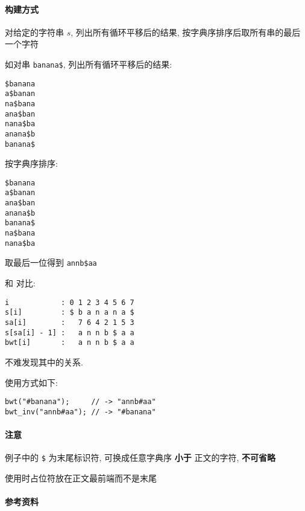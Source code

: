 \paragraph{构建方式}

对给定的字符串 \(s\), 列出所有循环平移后的结果, 按字典序排序后取所有串的最后一个字符

如对串 \verb|banana$|, 列出所有循环平移后的结果:

\begin{verbatim}
$banana
a$banan
na$bana
ana$ban
nana$ba
anana$b
banana$
\end{verbatim}

按字典序排序:

\begin{verbatim}
$banana
a$banan
ana$ban
anana$b
banana$
na$bana
nana$ba
\end{verbatim}

取最后一位得到 \verb|annb$aa|

和  对比:

\begin{verbatim}
i            : 0 1 2 3 4 5 6 7
s[i]         : $ b a n a n a $
sa[i]        :   7 6 4 2 1 5 3
s[sa[i] - 1] :   a n n b $ a a
bwt[i]       :   a n n b $ a a
\end{verbatim}

不难发现其中的关系.

使用方式如下:

\begin{verbatim}
bwt("#banana");     // -> "annb#aa"
bwt_inv("annb#aa"); // -> "#banana"
\end{verbatim}

\paragraph{注意}

例子中的 \verb|$| 为末尾标识符, 可换成任意字典序 \textbf{小于} 正文的字符, \textbf{不可省略}

使用时占位符放在正文最前端而不是末尾

\paragraph{参考资料} \cite{enwiki:1214062423}
